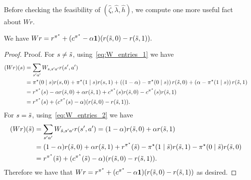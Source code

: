 \documentclass[mnsc,nonblindrev]{informs3}
\newcommand{\one}{\mathbf{1}}
\newcommand{\pistar}{\pi^\star}
\newcommand{\hhat}{\widehat{h}}
\newcommand{\zetahat}{\widehat{\zeta}}
\newcommand{\lambdahat}{\widehat{\lambda}}
\begin{document}
\begin{APPENDICES}
Before checking the feasibility of $(\zetahat, \lambdahat, \hhat)$, we compute one more useful fact about $Wr$.
\begin{lemma}
    \label{lem:Wr_computation}
    We have
    $
    Wr = r^{\pistar} + (c^{\pistar} - \alpha \one)(r(\Tilde{s},0) - r(\Tilde{s},1)).
    $
\end{lemma}
\begin{proof}{Proof.}
    For $s \neq \Tilde{s}$, using~\eqref{eq:W_entries_1} we have
\begin{align*}
    (Wr)(s) 
    &= \sum_{s'a'} W_{s, s'a'} r(s',a') \\
    &= \pistar(0 \mid s) r(s,0) + \pistar(1 \mid s) r(s,1) + \left((1-\alpha) - \pistar(0\mid s) \right) r(\Tilde{s},0) + \left( \alpha - \pistar(1\mid s)\right) r(\Tilde{s},1) \\
    &= r^{\pistar}(s) - \alpha r(\Tilde{s},0) + \alpha r(\Tilde{s},1) + c^{\pistar}(s)r(\Tilde{s},0) - c^{\pistar}(s)r(\Tilde{s},1) \\
    &=r^{\pistar}(s) + (c^{\pistar}(s) - \alpha)(r(\Tilde{s},0) - r(\Tilde{s},1)).
\end{align*}
For $s = \Tilde{s}$, using~\eqref{eq:W_entries_2} we have
\begin{align*}
    (Wr)(\Tilde{s}) 
    &= \sum_{s'a'} W_{\Tilde{s}, s'a'} r(s',a') = (1-\alpha )r(\Tilde{s},0) + \alpha r(\Tilde{s},1) \\
    &= (1-\alpha )r(\Tilde{s},0) + \alpha r(\Tilde{s},1) + r^{\pistar}(\Tilde{s}) - \pistar(1 \mid \Tilde{s})r(\Tilde{s},1) - \pistar(0 \mid \Tilde{s})r(\Tilde{s},0) \\
    &= r^{\pistar}(\Tilde{s}) + (c^{\pistar}(\Tilde{s}) - \alpha)(r(\Tilde{s},0) - r(\Tilde{s},1)).
\end{align*}
Therefore we have that
$
    Wr = r^{\pistar} + (c^{\pistar} - \alpha \one)(r(\Tilde{s},0) - r(\Tilde{s},1))
$
as desired.
\end{proof}


\end{APPENDICES}
\end{document}
